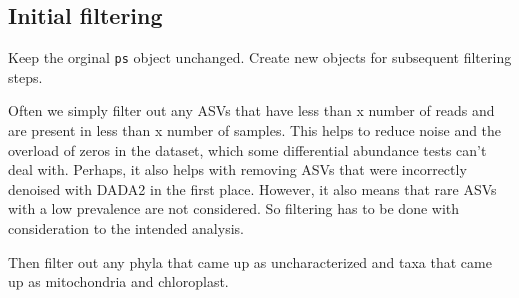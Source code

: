 \documentclass[
]{book}
\begin{document}
\hypertarget{initial-filtering}{%
\subsection{Initial filtering}\label{initial-filtering}}

Keep the orginal \texttt{ps} object unchanged. Create new objects for subsequent filtering steps.

Often we simply filter out any ASVs that have less than x number of reads and are present in less than x number of samples. This helps to reduce noise and the overload of zeros in the dataset, which some differential abundance tests can't deal with. Perhaps, it also helps with removing ASVs that were incorrectly denoised with DADA2 in the first place. However, it also means that rare ASVs with a low prevalence are not considered. So filtering has to be done with consideration to the intended analysis.

Then filter out any phyla that came up as uncharacterized and taxa that came up as mitochondria and chloroplast.
\end{document}
